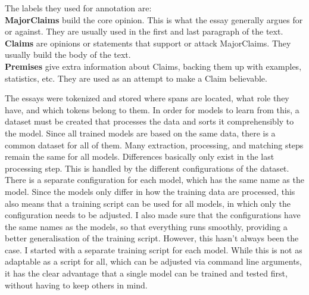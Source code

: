 \documentclass[12]{article}
\theoremstyle{mytheoremstyle}
\theoremstyle{mytheoremstyle}
\theoremstyle{myproblemstyle}
\begin{document}
  The labels they used for annotation are:\\
  \textbf{MajorClaims} build the core opinion. 
  This is what the essay generally argues for or against. 
  They are usually used in the first and last paragraph of the text.\\
  \textbf{Claims} are opinions or statements that support or attack MajorClaims. 
  They usually build the body of the text.\\
  \textbf{Premises} give extra information about Claims, backing them up with examples, statistics, etc.
  They are used as an attempt to make a Claim believable.

  The essays were tokenized and stored where spans are located, what role they have, and which tokens belong to them. 
  In order for models to learn from this, a dataset must be created that processes the data and sorts it comprehensibly to the model. 
  Since all trained models are based on the same data, there is a common dataset for all of them. 
  Many extraction, processing, and matching steps remain the same for all models. 
  Differences basically only exist in the last processing step. 
  This is handled by the different configurations of the dataset. 
  There is a separate configuration for each model, which has the same name as the model. 
  Since the models only differ in how the training data are processed, this also means that a training script can be used for all models, in which only the configuration needs to be adjusted. 
  I also made sure that the configurations have the same names as the models, so that everything runs smoothly, providing a better generalisation of the training script. 
  However, this hasn't always been the case. 
  I started with a separate training script for each model. 
  While this is not as adaptable as a script for all, which can be adjusted via command line arguments, it has the clear advantage that a single model can be trained and tested first, without having to keep others in mind.
\end{document}
